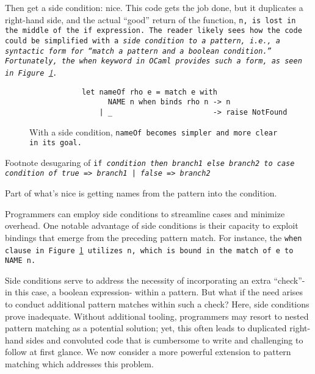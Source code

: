 \documentclass[manuscript,screen,review, 12pt]{acmart}
\begin{document}
\begin{outline}[enumerate]
    \3 Then get a side condition: nice. This code gets the job done, but it
    duplicates a right-hand side, and the actual “good” return of the function,
    \tt{n}, is lost in the middle of the \tt{if} expression. The reader likely
    sees how the code could be simplified with a \it{side condition} to a
    pattern, i.e., a syntactic form for “match a pattern \it{and} a boolean
    condition.” Fortunately, the \tt{when} keyword in OCaml provides such a
    form, as seen in Figure~\ref{fig:whennameof}.
        
        \begin{figure}[ht]
            \begin{verbatim}
            let nameOf rho e = match e with     
                  NAME n when binds rho n -> n
                | _                       -> raise NotFound  
                \end{verbatim}
            \caption{With a side condition, \tt{nameOf} becomes simpler and more
            clear in its goal.}
            \label{fig:whennameof}
            \end{figure}

        
    \3 Footnote desugaring of \tt{if} \it{condition} \tt{then} \it{branch1} \tt{else} \it{branch2} to \tt{case} \it{condition} \tt{of} \tt{true =>} \it{branch1} \tt{| false =>} \it{branch2}
    
    \3 Part of what's nice is getting names from the pattern into the condition. 

    Programmers can employ side conditions to streamline cases and minimize
    overhead. One notable advantage of side conditions is their capacity to
    exploit bindings that emerge from the preceding pattern match. For
    instance, the \tt{when} clause in Figure~\ref{fig:whennameof} utilizes \tt{n},
    which is bound in the match of \tt{e} to \tt{NAME n}.

    Side conditions serve to address the necessity of incorporating an extra
    “check”- in this case, a boolean expression- within a pattern. But what if
    the need arises to conduct additional pattern matches within such a check?
    Here, side conditions prove inadequate. Without additional tooling,
    programmers may resort to nested pattern matching as a potential solution;
    yet, this often leads to duplicated right-hand sides and convoluted code
    that is cumbersome to write and challenging to follow at first glance. We
    now consider a more powerful extension to pattern matching which addresses
    this problem. 


\end{outline}
\end{document}
